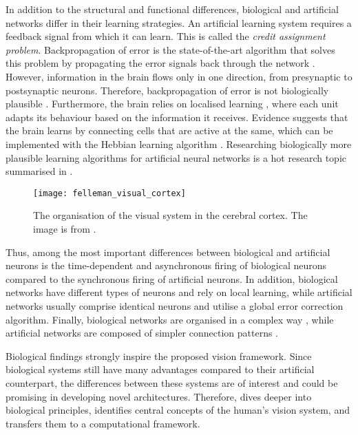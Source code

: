 In addition to the structural and functional differences, biological and artificial networks differ in their learning strategies.
An artificial learning system requires a feedback signal from which it can learn.
This is called the \emph{credit assignment problem}.
Backpropagation of error  is the state-of-the-art algorithm that solves this problem by propagating the error signals back through the network .
However, information in the brain flows only in one direction, from presynaptic to postsynaptic neurons.
Therefore, backpropagation of error is not biologically plausible .
Furthermore, the brain relies on localised learning , where each unit adapts its behaviour based on the information it receives.
Evidence suggests that the brain learns by connecting cells that are active at the same, which can be implemented with the Hebbian learning algorithm .
Researching biologically more plausible learning algorithms for artificial neural networks is a hot research topic summarised in .

\begin{figure}[h]
    \centering
    \texttt{[image: felleman\_visual\_cortex]}
    \caption[Organisation of the visual system in the cerebral cortex]{The organisation of the visual system in the cerebral cortex. The image is from .}
\end{figure}

Thus, among the most important differences between biological and artificial neurons is the time-dependent and asynchronous firing of biological neurons compared to the synchronous firing of artificial neurons. In addition, biological networks have different types of neurons and rely on local learning, while artificial networks usually comprise identical neurons and utilise a global error correction algorithm. Finally, biological networks are organised in a complex way , while artificial networks are composed of simpler connection patterns .

Biological findings strongly inspire the proposed vision framework.
Since biological systems still have many advantages compared to their artificial counterpart, the differences between these systems are of interest and could be promising in developing novel architectures.
Therefore,  dives deeper into biological principles, identifies central concepts of the human's vision system, and transfers them to a computational framework.

